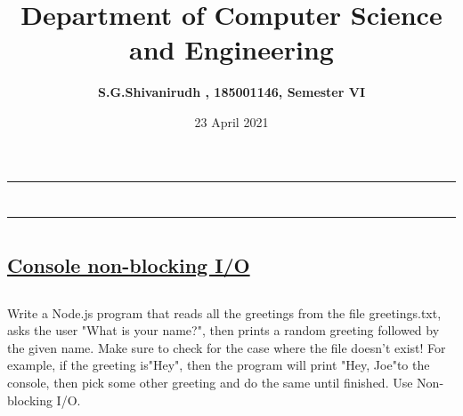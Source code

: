 \documentclass[12pt,letterpaper]{article}
\title{\textbf{Department of Computer Science and Engineering}}
\author{\textbf{S.G.Shivanirudh , 185001146, Semester VI }}
\date{23 April 2021}
\begin{document}
\maketitle
\hrule
\section*{}
\hrule 
\bigskip\bigskip

\section*{}

\subsection*{\underline{\textbf{Console non-blocking I/O}}}
\subsection*{}
\begin{flushleft}
    Write   a Node.js program that reads all the greetings from the file greetings.txt, asks the user "What is your name?",
    then prints a random greeting followed by the given name. Make sure to check for the case where the file doesn’t exist!
    For example, if the greeting is"Hey", then the program will print "Hey, Joe"to the console, then pick some other greeting 
    and do the same until finished. Use Non-blocking I/O.
\end{flushleft}

\subsection*{}
\subsubsection*{}
\begin{flushleft}

\end{flushleft}

\subsubsection*{{}}
\begin{flushleft}
    
\end{flushleft}
\end{document}
